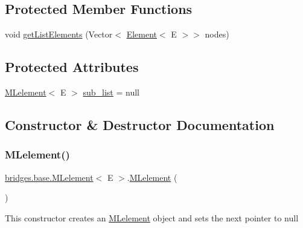 \subsection*{Protected Member Functions}
\begin{DoxyCompactItemize}
\item 
void \hyperlink{classbridges_1_1base_1_1_m_lelement_a496378739f031ef451a6ab1f63c5770f}{get\+List\+Elements} (Vector$<$ \hyperlink{classbridges_1_1base_1_1_element}{Element}$<$ E $>$$>$ nodes)
\end{DoxyCompactItemize}
\subsection*{Protected Attributes}
\begin{DoxyCompactItemize}
\item 
\hyperlink{classbridges_1_1base_1_1_m_lelement}{M\+Lelement}$<$ E $>$ \hyperlink{classbridges_1_1base_1_1_m_lelement_a7dee2985f9a8134d3076eb9478422403}{sub\+\_\+list} = null
\end{DoxyCompactItemize}


\subsection{Constructor \& Destructor Documentation}
\mbox{\label{classbridges_1_1base_1_1_m_lelement_a721d1369c297dc3a3617a1476cb6f5f8}} 
\subsubsection{\texorpdfstring{M\+Lelement()}{MLelement()}\hspace{0.1cm}{\footnotesize\ttfamily [1/4]}}
{\footnotesize\ttfamily \hyperlink{classbridges_1_1base_1_1_m_lelement}{bridges.\+base.\+M\+Lelement}$<$ E $>$.\hyperlink{classbridges_1_1base_1_1_m_lelement}{M\+Lelement} (\begin{DoxyParamCaption}{ }\end{DoxyParamCaption})}

This constructor creates an \hyperlink{classbridges_1_1base_1_1_m_lelement}{M\+Lelement} object and sets the next pointer to null \mbox{\label{classbridges_1_1base_1_1_m_lelement_ad0437d26107039d98cdba6277cff19e2}} 
